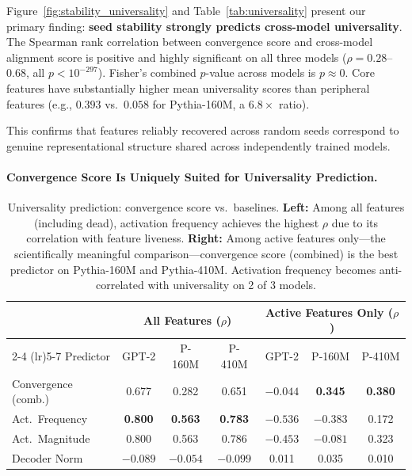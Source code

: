 \documentclass[final]{article}
\begin{document}
Figure~\ref{fig:stability_universality} and Table~\ref{tab:universality} present our primary finding: \textbf{seed stability strongly predicts cross-model universality}. The Spearman rank correlation between convergence score and cross-model alignment score is positive and highly significant on all three models ($\rho = 0.28$--$0.68$, all $p < 10^{-297}$). Fisher's combined $p$-value across models is $p \approx 0$. Core features have substantially higher mean universality scores than peripheral features (e.g., $0.393$ vs.\ $0.058$ for Pythia-160M, a $6.8\times$ ratio).

This confirms that features reliably recovered across random seeds correspond to genuine representational structure shared across independently trained models.

\paragraph{Convergence Score Is Uniquely Suited for Universality Prediction.}

\begin{table}[t]
\caption{Universality prediction: convergence score vs.\ baselines. \textbf{Left:} Among all features (including dead), activation frequency achieves the highest $\rho$ due to its correlation with feature liveness. \textbf{Right:} Among active features only---the scientifically meaningful comparison---convergence score (combined) is the best predictor on Pythia-160M and Pythia-410M. Activation frequency becomes anti-correlated with universality on 2 of 3 models.}
\label{tab:universality_baselines}
\centering
\begin{tabular}{lcccccc}
\toprule
 & \multicolumn{3}{c}{All Features ($\rho$)} & \multicolumn{3}{c}{Active Features Only ($\rho$)} \\
\cmidrule(lr){2-4} \cmidrule(lr){5-7}
Predictor & GPT-2 & P-160M & P-410M & GPT-2 & P-160M & P-410M \\
\midrule
Convergence (comb.) & 0.677 & 0.282 & 0.651 & $-0.044$ & \textbf{0.345} & \textbf{0.380} \\
Act.\ Frequency & \textbf{0.800} & \textbf{0.563} & \textbf{0.783} & $-0.536$ & $-0.383$ & 0.172 \\
Act.\ Magnitude & 0.800 & 0.563 & 0.786 & $-0.453$ & $-0.081$ & 0.323 \\
Decoder Norm & $-0.089$ & $-0.054$ & $-0.099$ & 0.011 & 0.035 & 0.010 \\
\bottomrule
\end{tabular}
\end{table}
\end{document}
